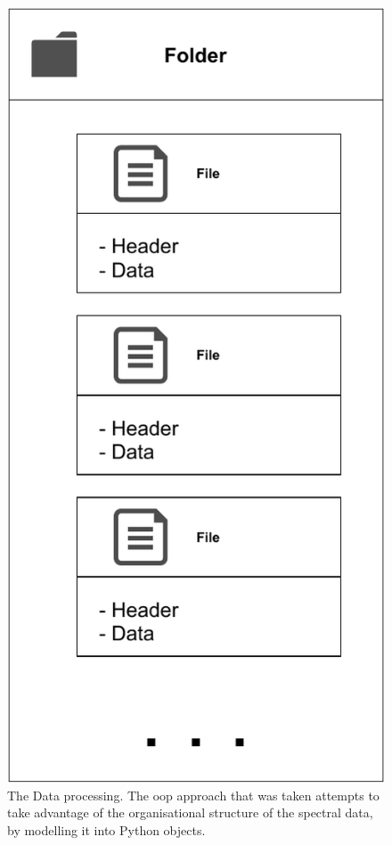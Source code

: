 \begin{figure}[htpb]
    \centering
    \includegraphics[width=0.3\linewidth]{img/pdf/data_processing_general.pdf}
    \caption{The Data processing. The \gls{oop} approach that was taken
    attempts to take advantage of the organisational structure of the
    spectral data, by modelling it into Python objects.}
    \label{fig:data_processing_general}
\end{figure}

